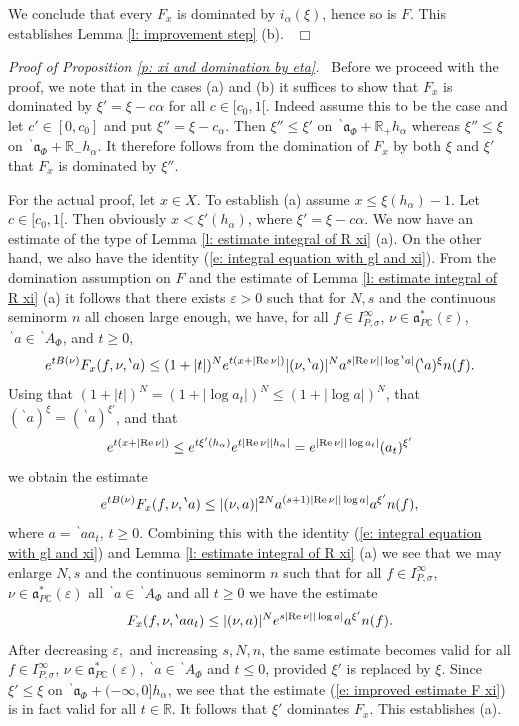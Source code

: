 \documentclass[12pt,a4paper]{article}
\def\qed{~\hfill\hbox{$\Box$}\medbreak}
\def\msy#1{{\mathbb #1}}
\def\C{{\msy C}}
\def\R{{\msy R}}
\def\ga{\alpha}
\def\ge{\varepsilon}
\def\gs{\sigma}
\def\got#1{\mathfrak #1}
\def\fa{{\got a}}
\def\Re{{\rm Re}\,}
\def\iC{{\scriptscriptstyle \C}}
\numberwithin{Thm}{section}
\numberwithin{equation}{section}
\def\faPdc{{\fa_{P\iC}^*}}
\numberwithin{equation}{section}
\def\bp{\!{\,}^\backprime}
\def\faPdc{\fa_{P\iC}^*}
\def\snorm{n}
\def\IPgs{I_{P,\gs}^\infty}
\def\xx{x}
\def\xxi{\xi}
\begin{document}
We conclude that every $F_\xx$ is dominated by $i_\ga(\xxi)$, hence so is $F.$ 
This establishes Lemma \ref{l: improvement step} (b).
\qed

{\em Proof of Proposition \ref{p: xi and domination by eta}.\ }
Before we proceed with the proof, we note that in the cases (a) and (b) it suffices to 
show that $F_\xx$ is dominated by $\xxi' = \xxi -  c\ga$ for all $c \in [c_0,1 [.$ Indeed 
assume this to be the case and let $c' \in [0, c_0]$ and put $\xxi''= \xxi - c_\ga.$ 
Then $\xxi'' \leq \xxi'$ on $\bp\! \fa_\Phi + \R_+ h_\ga$ whereas 
$\xxi'' \leq \xxi $ on $\bp\! \fa_\Phi + \R_- h_\ga.$ It therefore follows from the domination
of $F_\xx$ by both $\xxi$ and $\xxi'$ that $F_\xx$ is dominated by $\xxi''.$

For the actual proof, let $\xx \in X.$ 
To establish (a) assume $\xx \leq \xxi(h_\ga) -1.$ Let $c \in [c_0, 1[.$ 
Then obviously $\xx < \xxi'(h_\ga)$, where $\xxi' = \xxi - c\ga.$ 
We now have an estimate of the type of Lemma \ref{l: estimate integral of R xi} (a).
On the other hand, we also have the identity (\ref{e: integral equation with gl and xi}). From the domination assumption on $F$ and the estimate of Lemma \ref{l: estimate integral of R xi} (a) it follows that there exists 
$\ge > 0$ such that for $N, s$ and the continuous seminorm $\snorm$ 
all chosen large enough, we have, for all $f \in \IPgs$, $\nu \in \faPdc(\ge)$, 
$\bp a \in \bp A_\Phi$, and $t \geq 0,$ 
 $$ 
e^{t B(\nu)} F_\xx(f, \nu, \bp a) \leq (1 + |t|)^N e^{t(\xx + |\Re \nu|) } |(\nu, \bp a)|^N a^{s|\Re \nu||\log \bp a|} 
(\bp a)^\xxi \snorm(f).
$$  
Using that $(1 + |t|)^N = (1 + |\log a_t|)^N \leq (1 + | \log a|)^N$, that 
$(\bp a)^\xxi = (\bp a)^{\xxi'}$, and that 
$$
e^{t(\xx + |\Re \nu|) } \leq e^{t\xxi'(h_\ga)}e^{t |\Re \nu||h_\ga|} =  e^{|\Re \nu ||\log a_t|}(a_t)^{\xxi'}
$$ 
we obtain
the estimate
$$ 
e^{t B(\nu)} F_\xx(f,\nu, \bp a) \leq |(\nu,a)|^{2N} a^{(s+1)|\Re \nu||\log a|} a^{\xxi' } \snorm(f),
$$
where $a = \bp a a_t$, $t \geq 0.$ 
Combining this with the identity (\ref{e: integral equation with gl and xi}) and  Lemma \ref{l: estimate integral of R xi} (a) we see that we may enlarge
$N, s$ and the continuous seminorm $\snorm$ such that for all $f \in \IPgs$, 
$\nu \in \faPdc(\ge)$ all $\bp a \in \bp A_\Phi$ and all $t \geq 0$ we have the estimate
\begin{equation}
\label{e: improved estimate F xi}
F_\xx(f, \nu, \bp a a_t) \leq |(\nu, a)|^N e^{s|\Re \nu||\log a|} a^{\xxi'} \snorm(f).
\end{equation}
After decreasing $\ge,$ and increasing $s, N, \snorm$, the same estimate becomes valid 
for all $f \in \IPgs$, $\nu \in \faPdc(\ge)$, $\bp a\in \bp A_\Phi$ and $t \leq 0$, 
provided $\xxi'$ is replaced by $\xxi.$ Since $\xxi' \leq \xxi$ 
on $\bp \fa_\Phi + (-\infty, 0] h_\ga$, we see that the estimate 
(\ref{e: improved estimate F xi}) is in fact valid for all $t \in \R.$ 
It follows that $\xxi'$ dominates $F_\xx.$ This establishes (a).
\end{document}
